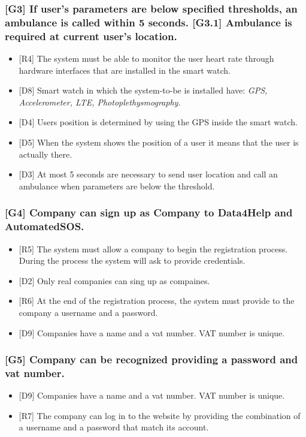 \documentclass{article}
\begin{document}
\subsubsection{[G3] If user's parameters are below specified thresholds, an ambulance is called within 5 seconds. [G3.1] Ambulance is required at current user's location.}
\begin{itemize}
\item {[R4]} The system must be able to monitor the user heart rate through hardware interfaces that are installed in the smart watch.
\item {[D8]} Smart watch in which the system-to-be is installed have: \emph{GPS, Accelerometer, LTE, Photoplethysmography}.
\item {[D4]} Users position is determined by using the GPS inside the smart watch.
\item {[D5]} When the system shows the position of a user it means that the user is actually there.
\item {[D3]} At most 5 seconds are necessary to send user location and call an ambulance when parameters are below the threshold.
\end{itemize}
\subsubsection{[G4] Company can sign up as Company to Data4Help and AutomatedSOS.}
\begin{itemize}
\item {[R5]} The system must allow a company to begin the registration process. During the process the system will ask to provide credentials.
\item {[D2]} Only real companies can sing up as compaines.
\item {[R6]} At the end of the registration process, the system must provide to the company a username and a password.
\item {[D9]} Companies have a name and a vat number. VAT number is unique.
\end{itemize}
\subsubsection{[G5] Company can be recognized providing a password and vat number.}
\begin{itemize}
\item {[D9]} Companies have a name and a vat number. VAT number is unique.
\item {[R7]} The company can log in to the website by providing the combination of a username and a password that match its account.
\end{itemize}
\end{document}
